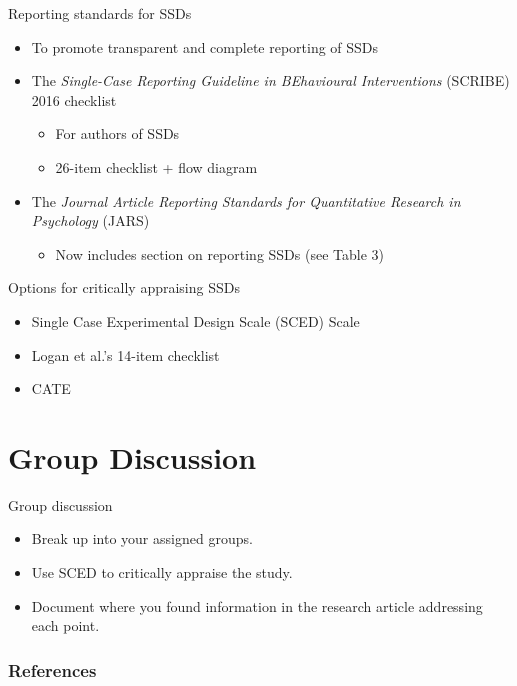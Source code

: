 \documentclass{beamer}
\begin{document}
% 
\begin{frame}{Reporting standards for SSDs}
	\begin{itemize}
	\item To promote transparent and complete reporting of SSDs
	\item The \emph{Single-Case Reporting Guideline in BEhavioural Interventions} (SCRIBE) 2016 checklist \citep{Tate2016a}
		\begin{itemize}
		\item For authors of SSDs
		\item 26-item checklist + flow diagram
		\end {itemize}
	\item The \emph{Journal Article Reporting Standards for Quantitative Research in Psychology} (JARS) \citep{Appelbaum2018}
		\begin{itemize}
		\item Now includes section on reporting SSDs (see Table 3)
		\end{itemize}
	\end {itemize}
\end{frame}

% 
\begin{frame}{Options for critically appraising SSDs}
	\begin{itemize}
	\item Single Case Experimental Design Scale (SCED) Scale \citep{Tate2008}
	\item Logan et al.'s 14-item checklist \citep[p. 102]{Logan2008}	
	\item CATE \citep{Dollaghan2007a}
	\end{itemize}
\end{frame}

\section{Group Discussion}

% 
\begin{frame}{Group discussion}
	\begin{itemize}
	\item Break up into your assigned groups.
	\item Use SCED \citep[pp. 400-1]{Tate2008} to critically appraise the study.
	\item Document where you found information in the research article addressing each point.
	\end{itemize}
\end{frame}

\begin{frame}[allowframebreaks] %
	\frametitle{References}
	
	\small
\end{frame}
\end{document}
